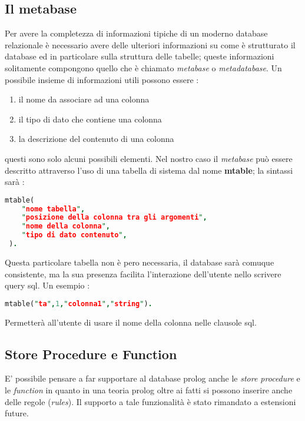 \subsection{Il metabase}
Per avere la completezza di informazioni tipiche di un moderno database relazionale è necessario avere delle ulteriori informazioni su come è strutturato il database ed in particolare sulla struttura delle tabelle; queste informazioni solitamente compongono quello che è chiamato \emph{metabase} o \emph{metadatabase}. Un possibile insieme di informazioni utili possono essere : 
\begin{enumerate}
\item il nome da associare ad una colonna
\item il tipo di dato che contiene una colonna
\item la descrizione del contenuto di una colonna 
\end{enumerate}
questi sono solo alcuni possibili elementi. Nel nostro caso il \emph{metabase} può essere descritto attraverso l'uso di una tabella di sistema dal nome {\bf mtable}; la sintassi sarà : 
\begin{lstlisting}[language=Prolog,showstringspaces=false]
 mtable(
	"nome tabella",
	"posizione della colonna tra gli argomenti",
	"nome della colonna",
	"tipo di dato contenuto",
 ).
\end{lstlisting}
Questa particolare tabella non è pero necessaria, il database sarà comuque consistente, ma la sua presenza facilita l'interazione dell'utente nello scrivere query sql. Un esempio :
\begin{lstlisting}[language=Prolog,showstringspaces=false]
 mtable("ta",1,"colonna1","string").
\end{lstlisting}
Permetterà all'utente di usare il nome della colonna nelle clausole sql.

\subsection{Store Procedure e Function}
E' possibile pensare a far supportare al database prolog anche le \emph{store procedure} e le \emph{function}  in quanto in una teoria prolog oltre ai fatti si possono inserire anche delle regole (\emph{rules}). Il supporto a tale funzionalità è stato rimandato a estensioni future. 
